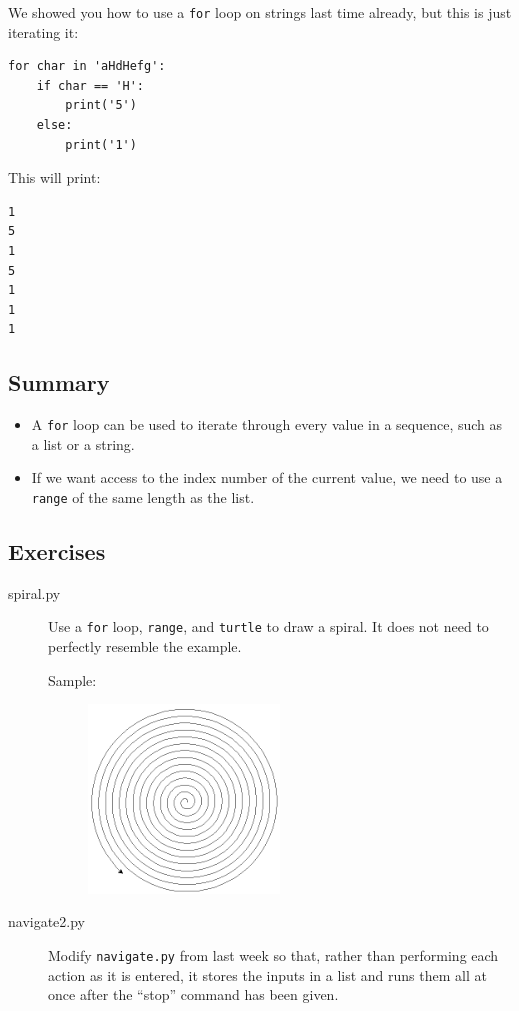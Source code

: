 \documentclass[11pt]{cselabheader}
\begin{document}
We showed you how to use a \lstinline!for! loop on strings last time already,
but this is just iterating it:
\begin{lstlisting}
for char in 'aHdHefg':
    if char == 'H':
        print('5')
    else:
        print('1')
\end{lstlisting}

This will print:
\begin{lstlisting}[style=bash]
1
5
1
5
1
1
1
\end{lstlisting}

\subsection{Summary}
\begin{itemize}
  \item A \lstinline{for} loop can be used to iterate through every value in a
    sequence, such as a list or a string.
  \item If we want access to the index number of the current value, we need to
    use a \lstinline{range} of the same length as the list.
\end{itemize}

\subsection{Exercises}
\label{subsec:forex}

\begin{description}
  \item[spiral.py] Use a \lstinline{for} loop, \lstinline{range}, and
    \lstinline{turtle} to draw a spiral. It does not need to perfectly resemble
    the example.

    Sample:
    \begin{figure}[h]
      \centering
      \includegraphics[width=2.0in]{img/spiral}
    \end{figure}

  \item[navigate2.py] Modify \texttt{navigate.py} from last week so that,
    rather than performing each action as it is entered, it stores the inputs in a
    list and runs them all at once after the ``stop'' command has been given.
\end{description}
\end{document}
